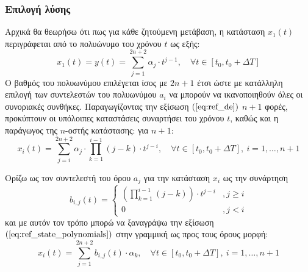 \subsubsection{Επιλογή λύσης} \label{subseq:ref_parameterization}
Αρχικά θα θεωρήσω ότι πως για κάθε ζητούμενη μετάβαση, η κατάσταση $x_1(t)$ περιγράφεται από το πολυώνυμο του χρόνου $t$ ως εξής:
\begin{equation}
	x_1(t) = y(t) = \sum_{j=1}^{2n + 2} \alpha_j \cdot t^{j-1},\quad \forall t \in [t_0,t_0+\Delta T]
	\label{eq:ref_de}
\end{equation}
Ο βαθμός του πολυωνύμου επιλέγεται ίσος με $2n + 1$ έτσι ώστε με κατάλληλη επιλογή των συντελεστών του πολυωνύμου $a_i$ να μπορούν να ικανοποιηθούν όλες οι συνοριακές συνθήκες. Παραγωγίζοντας την εξίσωση $(\ref{eq:ref_de})$ $n+1$ φορές, προκύπτουν οι υπόλοιπες καταστάσεις συναρτήσει του χρόνου $t$, καθώς και η παράγωγος της $n$-οστής κατάστασης: για $n+1$: 
\begin{equation}
x_i(t) = \sum_{j=i}^{2n + 2} \alpha_j \cdot \prod_{k = 1}^{i-1} (j-k) 
 \cdot t^{j-i},\quad \forall t \in [t_0,t_0+\Delta T], \: i = 1,\dots, n+1
\label{eq:ref_state_polynomials}
\end{equation}

Ορίζω ως τον συντελεστή του όρου $a_j$ για την κατάσταση $x_i$ ως την συνάρτηση
\begin{equation}
	b_{i,j}(t) = \begin{cases}
	\left( \prod_{k = 1}^{i-1} (j-k) \right)
	\cdot t^{j-i} &, j \geq i \\
	0 &, j < i 
	\end{cases}
	\label{eq:ref_system_coefficients}
\end{equation}
και με αυτόν τον τρόπο μπορώ να ξαναγράψω την εξίσωση $(\ref{eq:ref_state_polynomials})$ στην γραμμική ως προς τους όρους μορφή:
\begin{equation}
x_i(t) = \sum_{j=1}^{2n + 2} b_{i,j}(t) \cdot \alpha_k 
,\quad \forall t \in [t_0,t_0+\Delta T], \: i = 1,\dots, n+1
\end{equation}

